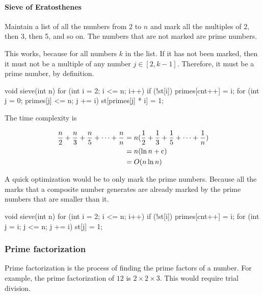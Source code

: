 \documentclass{article}
\begin{document}
\paragraph{Sieve of Eratosthenes}

Maintain a list of all the numbers from 2 to $n$ and mark all the multiples of 2, then 3, then 5, and so on. The numbers that are not marked are prime numbers.

This works, because for all numbers $k$ in the list. If it has not been marked, then it must not be a multiple of any number $j \in [2, k - 1]$. Therefore, it must be a prime number, by definition.

\begin{monos}
void sieve(int n) {
    for (int i = 2; i <= n; i++) {
        if (!st[i]) primes[cnt++] = i;
        for (int j = 0; primes[j] <= n; j += i) st[primes[j] * i] = 1;
    }
}
\end{monos}

The time complexity is

$$
\begin{aligned}
\frac{n}{2} + \frac{n}{3} + \frac{n}{5} + \cdots + \frac{n}{n} &= n (\frac{1}{2} + \frac{1}{3} + \frac{1}{5} + \cdots + \frac{1}{n}) \\
&= n(\ln n + \rm{c}) \\ 
&= O(n \ln n)
\end{aligned}
$$

A quick optimization would be to only mark the prime numbers. Because all the marks that a composite number generates are already marked by the prime numbers that are smaller than it.

\begin{monos}
void sieve(int n) {
    for (int i = 2; i <= n; i++) {
        if (!st[i]) {
            primes[cnt++] = i;
            for (int j = i; j <= n; j += i) st[j] = 1;
        }
    }
}
\end{monos}



\subsubsection{Prime factorization}

Prime factorization is the process of finding the prime factors of a number. For example, the prime factorization of $12$ is $2 \times 2 \times 3$. This would require trial division.

\end{document}
